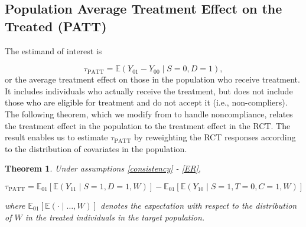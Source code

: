 \documentclass[12pt]{article}
\newtheorem{theorem}{Theorem}
\newcommand{\ex}{\mathbb{E}} %
\begin{document}

\subsection{Population Average Treatment Effect on the Treated (PATT)}
The estimand of interest is 

\begin{equation}
\tau_{\text{PATT}} = \ex\left( Y_{01} - Y_{00} \mid S=0, D=1\right),
\end{equation}
or the average treatment effect on those in the population who receive treatment.  It includes individuals who actually receive the treatment, but does not include those who are eligible for treatment and do not accept it (i.e., non-compliers).  The following theorem, which we modify from \cite{Hartman} to handle noncompliance, relates the treatment effect in the population to the treatment effect in the RCT. The result enables us to estimate $\tau_{\text{PATT}}$ by reweighting the RCT responses according to the distribution of covariates in the population. 

\begin{theorem}\label{thm1}
Under assumptions \eqref{consistency} - \eqref{ER},

$$\tau_{\text{PATT}} = \ex_{01}\left[  \ex\left(Y_{11} \mid S=1, D=1, W\right)\right]
-\ex_{01}\left[  \ex\left(Y_{10} \mid S=1, T=0, C=1, W\right) \right] $$

where $\ex_{01}\left[\ex(\cdot \mid\dots, W)\right]$ denotes the expectation with respect to the distribution of $W$ in the treated individuals in the target population.  
\end{theorem}
\end{document}
